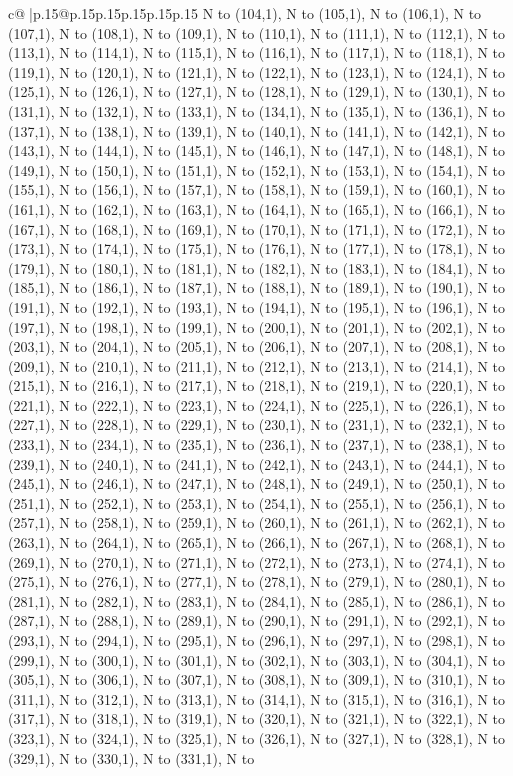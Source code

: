 \documentclass{article}
\begin{document}
{\begin{supertabular}{c@{$\;$}|p{.15\linewidth}@{}p{.15\linewidth}p{.15\linewidth}p{.15\linewidth}p{.15\linewidth}p{.15\linewidth}}
{{{N to (104,1), N to (105,1), N to (106,1), N to (107,1), N to (108,1), N to (109,1), N to (110,1), N to (111,1), N to (112,1), N to (113,1), N to (114,1), N to (115,1), N to (116,1), N to (117,1), N to (118,1), N to (119,1), N to (120,1), N to (121,1), N to (122,1), N to (123,1), N to (124,1), N to (125,1), N to (126,1), N to (127,1), N to (128,1), N to (129,1), N to (130,1), N to (131,1), N to (132,1), N to (133,1), N to (134,1), N to (135,1), N to (136,1), N to (137,1), N to (138,1), N to (139,1), N to (140,1), N to (141,1), N to (142,1), N to (143,1), N to (144,1), N to (145,1), N to (146,1), N to (147,1), N to (148,1), N to (149,1), N to (150,1), N to (151,1), N to (152,1), N to (153,1), N to (154,1), N to (155,1), N to (156,1), N to (157,1), N to (158,1), N to (159,1), N to (160,1), N to (161,1), N to (162,1), N to (163,1), N to (164,1), N to (165,1), N to (166,1), N to (167,1), N to (168,1), N to (169,1), N to (170,1), N to (171,1), N to (172,1), N to (173,1), N to (174,1), N to (175,1), N to (176,1), N to (177,1), N to (178,1), N to (179,1), N to (180,1), N to (181,1), N to (182,1), N to (183,1), N to (184,1), N to (185,1), N to (186,1), N to (187,1), N to (188,1), N to (189,1), N to (190,1), N to (191,1), N to (192,1), N to (193,1), N to (194,1), N to (195,1), N to (196,1), N to (197,1), N to (198,1), N to (199,1), N to (200,1), N to (201,1), N to (202,1), N to (203,1), N to (204,1), N to (205,1), N to (206,1), N to (207,1), N to (208,1), N to (209,1), N to (210,1), N to (211,1), N to (212,1), N to (213,1), N to (214,1), N to (215,1), N to (216,1), N to (217,1), N to (218,1), N to (219,1), N to (220,1), N to (221,1), N to (222,1), N to (223,1), N to (224,1), N to (225,1), N to (226,1), N to (227,1), N to (228,1), N to (229,1), N to (230,1), N to (231,1), N to (232,1), N to (233,1), N to (234,1), N to (235,1), N to (236,1), N to (237,1), N to (238,1), N to (239,1), N to (240,1), N to (241,1), N to (242,1), N to (243,1), N to (244,1), N to (245,1), N to (246,1), N to (247,1), N to (248,1), N to (249,1), N to (250,1), N to (251,1), N to (252,1), N to (253,1), N to (254,1), N to (255,1), N to (256,1), N to (257,1), N to (258,1), N to (259,1), N to (260,1), N to (261,1), N to (262,1), N to (263,1), N to (264,1), N to (265,1), N to (266,1), N to (267,1), N to (268,1), N to (269,1), N to (270,1), N to (271,1), N to (272,1), N to (273,1), N to (274,1), N to (275,1), N to (276,1), N to (277,1), N to (278,1), N to (279,1), N to (280,1), N to (281,1), N to (282,1), N to (283,1), N to (284,1), N to (285,1), N to (286,1), N to (287,1), N to (288,1), N to (289,1), N to (290,1), N to (291,1), N to (292,1), N to (293,1), N to (294,1), N to (295,1), N to (296,1), N to (297,1), N to (298,1), N to (299,1), N to (300,1), N to (301,1), N to (302,1), N to (303,1), N to (304,1), N to (305,1), N to (306,1), N to (307,1), N to (308,1), N to (309,1), N to (310,1), N to (311,1), N to (312,1), N to (313,1), N to (314,1), N to (315,1), N to (316,1), N to (317,1), N to (318,1), N to (319,1), N to (320,1), N to (321,1), N to (322,1), N to (323,1), N to (324,1), N to (325,1), N to (326,1), N to (327,1), N to (328,1), N to (329,1), N to (330,1), N to (331,1), N to }}}
\end{supertabular}}
\end{document}
